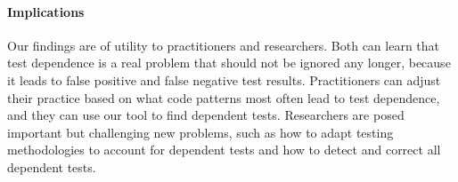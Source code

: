 \begin{itemize}
\end{itemize}
\vspace{-5mm}
\paragraph{Implications}
Our findings are of utility to practitioners and researchers.
Both can learn that test dependence is a real problem that should not be
ignored any longer, because it leads to false positive and false negative
test results.
Practitioners can adjust their practice based on what code patterns most
often lead to test dependence, and they can use our tool to 
find dependent tests.
Researchers are posed important but challenging new problems, such as how
to adapt testing methodologies to account for dependent tests and how to detect
and correct all dependent tests.




